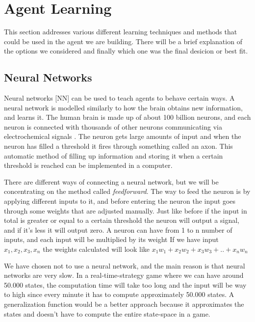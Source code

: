 \section{Agent Learning}\label{agent_learning}

This section addresses various different learning techniques and methods that could be used in the agent we are building. There will be a brief explanation of the options we considered and finally which one was the final desicion or best fit.

\subsection*{Neural Networks}			 
			
Neural networks [NN] can be used to teach agents to behave certain ways. A neural network is modelled similarly to how the brain obtains new information, and learns it. The human brain is made up of about 100 billion neurons, and each neuron is connected with thousands of other neurons communicating via electrochemical signals \cite{nn}. The neuron gets large amounts of input and when the neuron has filled a threshold it fires through something called an axon. This automatic method of filling up information and storing it when a certain threshold is reached can be implemented in a computer.

There are different ways of connecting a neural network, but we will be concentrating on the method called \textit{feedforward}. The way to feed the neuron is by applying different inputs to it, and before entering the neuron the input goes through some weights that are adjusted manually. Just like before if the input in total is greater or equal to a certain threshold the neuron will output a signal, and if it's less it will output zero.
A neuron can have from 1 to n number of inputs, and each input will be multiplied by its weight
If we have input $x_1, x_2, x_3, x_n$ the weights calculated will look like $x_1 w_1 + x_2 w_2 + x_3 w_3 + .. +  x_n w_n$

We have chosen not to use a neural network, and the main reason is that neural networks are very slow. In a real-time-strategy game where we can have around 50.000 states, the computation time will take too long and the input will be way to high since every minute it has to compute approximately 50.000 states. A generalization function would be a better approach because it approximates the states and doesn't have to compute the entire state-space in a game. 


